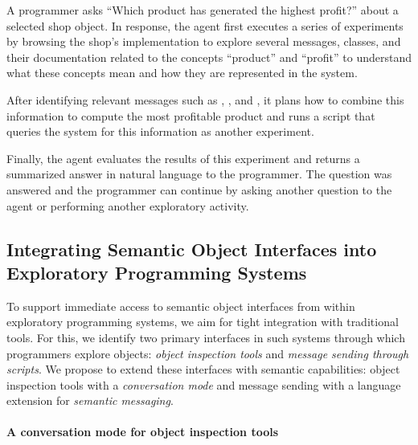 \begin{example}
	A programmer asks ``Which product has generated the highest profit?'' about a selected shop object.
	In response, the agent first executes a series of experiments by browsing the shop's implementation to explore several messages, classes, and their documentation related to the concepts ``product'' and ``profit'' to understand what these concepts mean and how they are represented in the system.

	After identifying relevant messages such as , , and , it plans how to combine this information to compute the most profitable product and runs a script that queries the system for this information as another experiment.

	Finally, the agent evaluates the results of this experiment and returns a summarized answer in natural language to the programmer.
	The question was answered and the programmer can continue by asking another question to the agent or performing another exploratory activity.
\end{example}

\subsection*{Integrating Semantic Object Interfaces into Exploratory Programming Systems}
\label{sec:design/agent/interfaces}

To support immediate access to semantic object interfaces from within exploratory programming systems, we aim for tight integration with traditional tools.
For this, we identify two primary interfaces in such systems through which programmers explore objects: \emph{object inspection tools} and \emph{message sending through scripts}.
We propose to extend these interfaces with semantic capabilities: object inspection tools with a \emph{conversation mode} and message sending with a language extension for \emph{semantic messaging}.

\paragraph{A conversation mode for object inspection tools}
\label{par:design/agent/interfaces/inspector}

